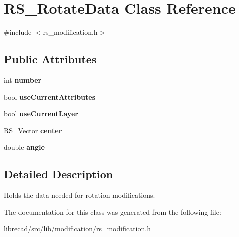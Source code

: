\hypertarget{classRS__RotateData}{\section{R\-S\-\_\-\-Rotate\-Data Class Reference}
\label{classRS__RotateData}
}


{\ttfamily \#include $<$rs\-\_\-modification.\-h$>$}

\subsection*{Public Attributes}
\begin{DoxyCompactItemize}
\item 
\hypertarget{classRS__RotateData_a4bbe83a0fe7075715f5f21b7d1464da2}{int {\bfseries number}}\label{classRS__RotateData_a4bbe83a0fe7075715f5f21b7d1464da2}

\item 
\hypertarget{classRS__RotateData_a0dffe90156572c6ceed8601fd8c13d0c}{bool {\bfseries use\-Current\-Attributes}}\label{classRS__RotateData_a0dffe90156572c6ceed8601fd8c13d0c}

\item 
\hypertarget{classRS__RotateData_ab2b5c3651c318faee9c14b84b554c1b0}{bool {\bfseries use\-Current\-Layer}}\label{classRS__RotateData_ab2b5c3651c318faee9c14b84b554c1b0}

\item 
\hypertarget{classRS__RotateData_aa0558a8ffff6f333455a232437a73260}{\hyperlink{classRS__Vector}{R\-S\-\_\-\-Vector} {\bfseries center}}\label{classRS__RotateData_aa0558a8ffff6f333455a232437a73260}

\item 
\hypertarget{classRS__RotateData_a4ff088348ae4a3c868c86d89fd5cbf17}{double {\bfseries angle}}\label{classRS__RotateData_a4ff088348ae4a3c868c86d89fd5cbf17}

\end{DoxyCompactItemize}


\subsection{Detailed Description}
Holds the data needed for rotation modifications. 

The documentation for this class was generated from the following file\-:\begin{DoxyCompactItemize}
\item 
librecad/src/lib/modification/rs\-\_\-modification.\-h\end{DoxyCompactItemize}
